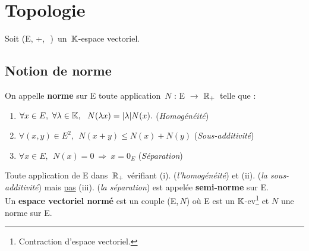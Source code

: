 
\section{Topologie}

\vspace{0.3cm}

\begin{center}
    Soit (E, +,\ \lce\,)\, un \(\,\mathbb{K}\)-espace vectoriel.
\end{center}
\vspace{0.2cm}
\subsection{Notion de norme}

\vspace{1.1cm}

\noindent On appelle \textbf{norme} sur E toute application \(\,N\) : E \(\to\) \(\mathbb{R}_+\,\) telle que :\vspace{0.1cm} 
\begin{enumerate}[leftmargin = 2cm, label=(\roman*).\,]
    \item \(\forall x\in E,\ \forall \lambda \in \mathbb{K},\ \ N(\lambda x)=|\lambda |N(x). \) \hspace{1cm} (\emph{Homogénéité})\vspace{0.1cm}

    \item \(\forall (x,y)\in E^2,\ \ N(x+y)\leq N(x)+N(y) \) \hspace{0.4cm} (\emph{Sous-additivité}) \vspace{0.1cm}

    \item \(\forall x\in E,\ \ N(x)=0\ \Rightarrow \ x=0_E \) \hspace{2cm} (\emph{Séparation})
\end{enumerate}
\vspace{0.9cm}
\noindent Toute application de E dans \(\,\mathbb{R}_+\) vérifiant (i). (\emph{l'homogénéité}) et (ii). (\emph{la sous-additivité}) mais \underline{pas} (iii). (\emph{la séparation}) est appelée \textbf{semi-norme} sur E.\vspace{0.1cm}\\
\noindent Un \textbf{espace vectoriel normé} est un couple (E,\(\,N\)) où E est un \(\mathbb{K}\)-ev\footnote{Contraction d'\guillemotleft espace vectoriel\guillemotright .} et \(N\) une norme sur E.

\vspace{1.5cm}

